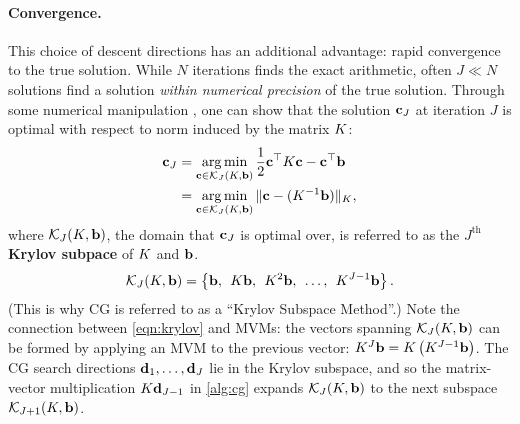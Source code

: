 

\paragraph{Convergence.}
This choice of descent directions has an additional advantage: rapid convergence to the true solution.
While $N$ iterations finds the exact arithmetic, often $J \ll N$ solutions find a solution \emph{within numerical precision} of the true solution.
Through some numerical manipulation \citep[see][]{golub2012matrix}, one can show that the solution $\mathbf{c}_J$ at iteration $J$ is optimal with respect to norm induced by the matrix $K$:
%
\begin{align}
  \mathbf{c}_J
  &= \operatorname*{arg\,min}_{\mathbf{c} \in \mathcal{K}_J (K, \mathbf{b})} \frac{1}{2} \mathbf{c}^\top K \mathbf{c} - \mathbf{c}^\top \mathbf{b}
  \nonumber \\
  &= \operatorname*{arg\,min}_{\mathbf{c} \in \mathcal{K}_J (K, \mathbf{b})} \Vert \mathbf{c} - (K^{-1} \mathbf{b}) \Vert_{K},
  \label{eqn:cg_optimality}
\end{align}
%
where $\mathcal{K}_J (K, \mathbf{b})$, the domain that $\mathbf{c}_J$ is optimal over, is referred to as the $J^\text{th}$ {\bf Krylov subpace} of $K$ and $\mathbf{b}$.
%
\begin{equation}
  \mathcal{K}_J (K, \mathbf{b}) = \left\{ \mathbf{b}, \:\: K \mathbf{b}, \:\: K^2 \mathbf{b}, \:\: \ldots, \:\: K^{J-1} \mathbf{b} \right\}.
  \label{eqn:krylov}
\end{equation}
%
(This is why CG is referred to as a ``Krylov Subspace Method''.)
Note the connection between \cref{eqn:krylov} and MVMs:
the vectors spanning $\mathcal{K}_J (K, \mathbf{b})$ can be formed by applying an MVM to the previous vector: $K^J \mathbf{b} = K \left( K^{J-1} \mathbf{b} \right)$.
The CG search directions $\mathbf{d}_1, \ldots, \mathbf{d}_J$ lie in the Krylov subspace, and so the matrix-vector multiplication $K \mathbf{d}_{J-1}$ in \cref{alg:cg} expands $\mathcal{K}_{J}(K, \mathbf{b})$ to the next subspace $\mathcal{K}_{J+1} (K, \mathbf{b})$.

